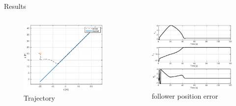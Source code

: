\documentclass{beamer}
\begin{document}
\begin{frame}{Results}
\begin{columns}
\begin{column}{0.5\textwidth}
\begin{figure}
\includegraphics[scale=0.4]{figs/matlab/inclinedLine/trajectory.eps}
\caption{Trajectory}
\end{figure}
\end{column}

\begin{column}{0.5\textwidth}
\begin{center}

\begin{figure}
\includegraphics[scale=0.4]{figs/matlab/inclinedLine/error.eps}
\caption{follower position error}
\end{figure}
\end{center}

\end{column}

\end{columns}

\end{frame}
\end{document}
